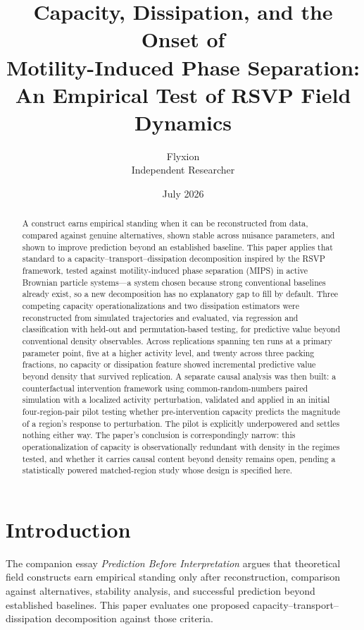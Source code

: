 \documentclass[11pt]{article}
\title{Capacity, Dissipation, and the Onset of\\ Motility-Induced Phase Separation:\\ \large An Empirical Test of RSVP Field Dynamics}
\author{Flyxion \\ \small Independent Researcher}
\date{July 2026}
\begin{document}
\maketitle

\begin{abstract}
\noindent A construct earns empirical standing when it can be reconstructed from data, compared against genuine alternatives, shown stable across nuisance parameters, and shown to improve prediction beyond an established baseline. This paper applies that standard to a capacity--transport--dissipation decomposition inspired by the RSVP framework, tested against motility-induced phase separation (MIPS) in active Brownian particle systems---a system chosen because strong conventional baselines already exist, so a new decomposition has no explanatory gap to fill by default. Three competing capacity operationalizations and two dissipation estimators were reconstructed from simulated trajectories and evaluated, via regression and classification with held-out and permutation-based testing, for predictive value beyond conventional density observables. Across replications spanning ten runs at a primary parameter point, five at a higher activity level, and twenty across three packing fractions, no capacity or dissipation feature showed incremental predictive value beyond density that survived replication. A separate causal analysis was then built: a counterfactual intervention framework using common-random-numbers paired simulation with a localized activity perturbation, validated and applied in an initial four-region-pair pilot testing whether pre-intervention capacity predicts the magnitude of a region's response to perturbation. The pilot is explicitly underpowered and settles nothing either way. The paper's conclusion is correspondingly narrow: this operationalization of capacity is observationally redundant with density in the regimes tested, and whether it carries causal content beyond density remains open, pending a statistically powered matched-region study whose design is specified here.
\end{abstract}

\newpage

\section{Introduction}

The companion essay \emph{Prediction Before Interpretation} \cite{PredictionBeforeInterpretation} argues that theoretical field constructs earn empirical standing only after reconstruction, comparison against alternatives, stability analysis, and successful prediction beyond established baselines. This paper evaluates one proposed capacity--transport--dissipation decomposition against those criteria.
\end{document}

